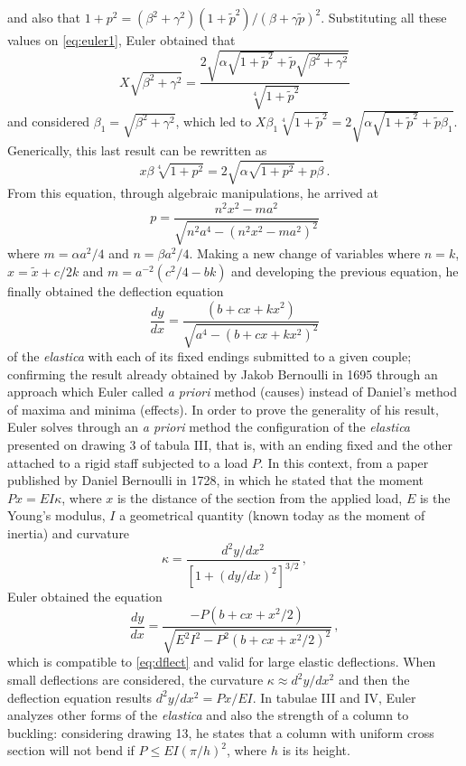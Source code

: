 and also that $1+p^2 = (\beta^2+\gamma^2)(1+\tilde{p}^2)/(\beta+\gamma\tilde{p})^2$. Substituting all these values on \eqref{eq:euler1}, Euler obtained that
\begin{equation*}
X\sqrt{\beta^2+\gamma^2} = \dfrac{2\sqrt{\alpha\sqrt{1+\tilde{p}^2}+ \tilde{p}\sqrt{\beta^2+\gamma^2}}}{\sqrt[4]{1+\tilde{p}^2}}
\end{equation*}
and considered $\beta_1=\sqrt{\beta^2+\gamma^2}$, which led to $X\beta_1\sqrt[4]{1+\tilde{p}^2} = 2\sqrt{\alpha\sqrt{1+\tilde{p}^2}+ \tilde{p}\beta_1}$. Generically, this last result can be rewritten as 
\begin{equation*}
x\beta\sqrt[4]{1+p^2} = 2\sqrt{\alpha\sqrt{1+p^2}+ p\beta}\,.
\end{equation*}
From this equation, through algebraic manipulations, he arrived at
\begin{equation*}
p=\dfrac{n^2x^2-ma^2}{\sqrt{n^2a^4-(n^2x^2-ma^2)^2}}
\end{equation*}
where $m=\alpha a^2/4$ and $n=\beta a^2/4$. Making a new change of variables where $n=k$, $x=\tilde{x}+c/2k$ and $m=a^{-2}(c^2/4-bk)$ and developing the previous equation, he finally obtained the deflection equation  
\begin{equation}\label{eq:dflect}
\dfrac{dy}{dx}=\dfrac{(b+c x+k x^2)}{\sqrt{a^4-(b+c x+kx^2)^2}}
\end{equation}
of the \emph{elastica} with each of its fixed endings submitted to a given couple; confirming the result already obtained by Jakob Bernoulli in 1695 through an approach which Euler called \emph{a priori} method (causes) instead of Daniel's method of maxima and minima (effects). In order to prove the generality of his result, Euler solves through an \emph{a priori} method the configuration of the \emph{elastica} presented on drawing 3 of tabula III, that is, with an ending fixed and the other attached to a rigid staff subjected to a load $P$. In this context, from a paper published by Daniel Bernoulli in 1728, in which he stated that the moment $Px=EI\kappa$, where $x$ is the distance of the section from the applied load, $E$ is the Young's modulus, $I$ a geometrical quantity (known today as the moment of inertia) and curvature 
\begin{equation*}
\kappa=\dfrac{d^2y/dx^2}{[1+({dy}/{dx})^2]^{3/2}}\,,
\end{equation*}
Euler obtained the equation
\begin{equation*}
\dfrac{dy}{dx}=\dfrac{-P(b+c x+x^2/2)}{\sqrt{E^2I^2-P^2(b+c x+x^2/2)^2}}\,,
\end{equation*}
which is compatible to \eqref{eq:dflect} and valid for large elastic deflections. When small deflections are considered, the curvature $\kappa \approx d^2y/dx^2$ and then the deflection equation results $d^2y/dx^2=Px/EI$. In tabulae III and IV, Euler analyzes other forms of the \emph{elastica} and also the strength of a column to buckling: considering drawing 13, he states that a column with uniform cross section will not bend if $P\leqslant EI(\pi/h)^2$, where $h$ is its height.

